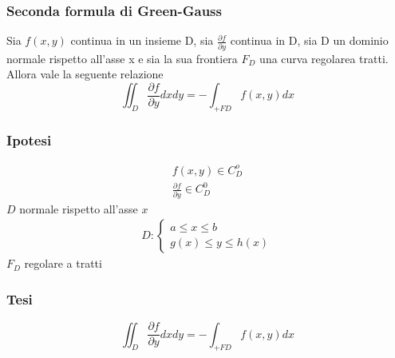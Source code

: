 \subsubsection{Seconda formula di Green-Gauss}
\begin{teorema}
	Sia $f(x,y)$ continua in un insieme D, sia $\frac{\partial f}{\partial y}$
	continua in D, sia D un dominio normale rispetto all'asse x e sia la sua
	frontiera $F_D$ una curva regolarea tratti. Allora vale la seguente
	relazione 
	\begin{equation}
		\iint_D \frac{\partial f}{\partial y} dxdy=-\int_{+FD} f(x,y) dx
	\end{equation}
	\begin{multicols}{2}
		\subsubsection{Ipotesi}
			\begin{equation*}
				\begin{matrix}
					f(x,y)\in C^o_D\\
					\frac{\partial f}{\partial y}\in C^0_D
				\end{matrix}
			\end{equation*}
			$D$ normale rispetto all'asse $x$
			\begin{align*}
			D:\begin{cases}
				a\leq x\leq b\\
				g(x)\leq y\leq h(x)
			\end{cases}
			\end{align*}
			$F_D$ regolare a tratti
		\subsubsection{Tesi}
		\begin{equation*}
			\iint_D \frac{\partial f}{\partial y} dxdy=-\int_{+FD} f(x,y)dx
		\end{equation*}
	\end{multicols}
\end{teorema}
